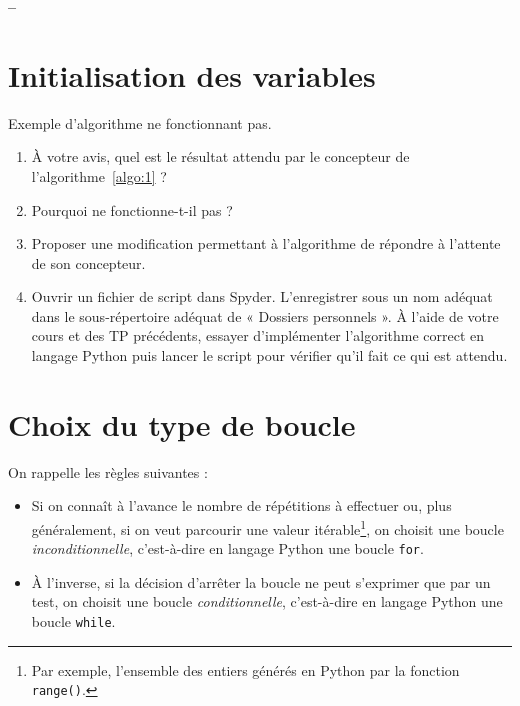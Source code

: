 

%



\begin{center}
{\Large\bf {\type} \no {\num} -- \descrip}
\end{center}


\section{Initialisation des variables}

\begin{algorithm}[H]

\caption{Exemple d'algorithme ne fonctionnant pas.}
\label{algo:1}
\end{algorithm}

\begin{enumerate}
 \item À votre avis, quel est le résultat attendu par le concepteur de l'algorithme~\ref{algo:1} ?
 
 \item Pourquoi ne fonctionne-t-il pas ?
 
 \item Proposer une modification permettant à l'algorithme de répondre à  l'attente de son concepteur.
 
 \item Ouvrir un fichier de script dans Spyder. L'enregistrer sous un nom adéquat dans le sous-répertoire adéquat de « Dossiers personnels ». À l'aide de votre cours et des TP précédents, essayer d'implémenter l'algorithme correct en langage Python puis lancer le script pour vérifier qu'il fait ce qui est attendu.
 
\end{enumerate}

\section{Choix du type de boucle}

On rappelle les règles suivantes :
\begin{itemize}
 \item Si on connaît à l'avance le nombre de répétitions à effectuer ou, plus généralement, si on veut parcourir une valeur itérable\footnote{Par exemple, l'ensemble des entiers générés en Python par la fonction \texttt{range()}.}, on choisit une boucle \textit{inconditionnelle}, c'est-à-dire en langage Python une boucle \texttt{for}.
 
 \item À l'inverse, si la décision d'arrêter la boucle ne peut s'exprimer que par un test, on choisit une boucle \textit{conditionnelle}, c'est-à-dire en langage Python une boucle \texttt{while}.

\end{itemize}

